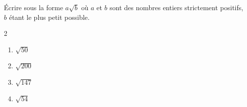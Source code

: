 \begin{exo}{}
	Écrire sous la forme $a\sqrt{b}$ où $a$ et $b$ sont des nombres entiers strictement positifs, $b$ étant le plus petit possible.
	\vspace*{-2mm}\begin{multicols}{2}
	\begin{enumerate}[itemsep=2mm]
		\item $\sqrt{50}$
		\item $\sqrt{200}$
		\item $\sqrt{147}$
		\item $\sqrt{54}$
	\end{enumerate}
	\end{multicols}\vspace*{-2mm}
\end{exo}
